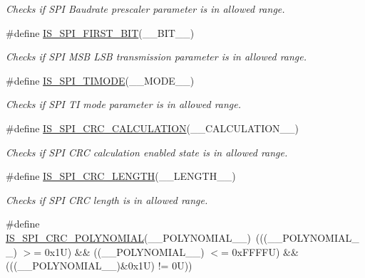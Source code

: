 \begin{DoxyCompactItemize}
\begin{DoxyCompactList}\small\item\em Checks if S\+PI Baudrate prescaler parameter is in allowed range. \end{DoxyCompactList}\item 
\#define \mbox{\hyperlink{group___s_p_i___private___macros_ga780c503aa8adae30dea1f034ac500d7f}{I\+S\+\_\+\+S\+P\+I\+\_\+\+F\+I\+R\+S\+T\+\_\+\+B\+IT}}(\+\_\+\+\_\+\+B\+I\+T\+\_\+\+\_\+)
\begin{DoxyCompactList}\small\item\em Checks if S\+PI M\+SB L\+SB transmission parameter is in allowed range. \end{DoxyCompactList}\item 
\#define \mbox{\hyperlink{group___s_p_i___private___macros_ga8e3c348af57cf973277018958fccfed9}{I\+S\+\_\+\+S\+P\+I\+\_\+\+T\+I\+M\+O\+DE}}(\+\_\+\+\_\+\+M\+O\+D\+E\+\_\+\+\_\+)
\begin{DoxyCompactList}\small\item\em Checks if S\+PI TI mode parameter is in allowed range. \end{DoxyCompactList}\item 
\#define \mbox{\hyperlink{group___s_p_i___private___macros_ga5416429a2e9024b142c972eacb1fd021}{I\+S\+\_\+\+S\+P\+I\+\_\+\+C\+R\+C\+\_\+\+C\+A\+L\+C\+U\+L\+A\+T\+I\+ON}}(\+\_\+\+\_\+\+C\+A\+L\+C\+U\+L\+A\+T\+I\+O\+N\+\_\+\+\_\+)
\begin{DoxyCompactList}\small\item\em Checks if S\+PI C\+RC calculation enabled state is in allowed range. \end{DoxyCompactList}\item 
\#define \mbox{\hyperlink{group___s_p_i___private___macros_ga772f85d2cf9be95f50c9b9526462a85e}{I\+S\+\_\+\+S\+P\+I\+\_\+\+C\+R\+C\+\_\+\+L\+E\+N\+G\+TH}}(\+\_\+\+\_\+\+L\+E\+N\+G\+T\+H\+\_\+\+\_\+)
\begin{DoxyCompactList}\small\item\em Checks if S\+PI C\+RC length is in allowed range. \end{DoxyCompactList}\item 
\#define \mbox{\hyperlink{group___s_p_i___private___macros_ga1b4b6bb5771cb0070af660d169d4ef09}{I\+S\+\_\+\+S\+P\+I\+\_\+\+C\+R\+C\+\_\+\+P\+O\+L\+Y\+N\+O\+M\+I\+AL}}(\+\_\+\+\_\+\+P\+O\+L\+Y\+N\+O\+M\+I\+A\+L\+\_\+\+\_\+)~(((\+\_\+\+\_\+\+P\+O\+L\+Y\+N\+O\+M\+I\+A\+L\+\_\+\+\_\+) $>$= 0x1\+U) \&\& ((\+\_\+\+\_\+\+P\+O\+L\+Y\+N\+O\+M\+I\+A\+L\+\_\+\+\_\+) $<$= 0x\+F\+F\+F\+F\+U) \&\& (((\+\_\+\+\_\+\+P\+O\+L\+Y\+N\+O\+M\+I\+A\+L\+\_\+\+\_\+)\&0x1\+U) != 0\+U))

\end{DoxyCompactItemize}
